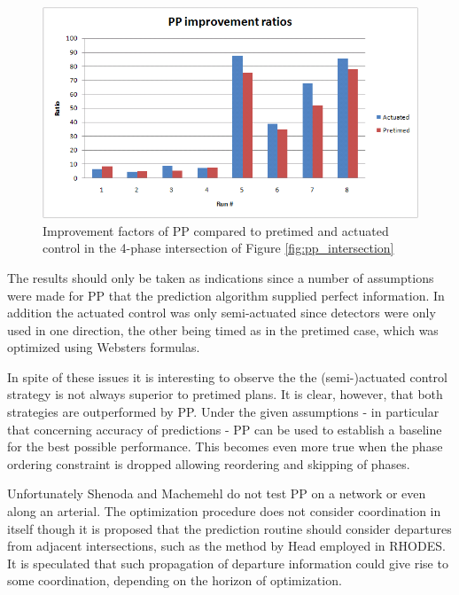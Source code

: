 \begin{figure}[!ht]
\begin{center}
\includegraphics[scale=0.5]{phase-by-phase_improvement_ratios.png} 
\end{center}
\caption{Improvement factors of PP compared to pretimed and actuated control in the 4-phase intersection of Figure \ref{fig:pp_intersection}}
\label{fig:pp_improvements}
\end{figure}

The results should only be taken as indications since a number of assumptions were made for PP that the prediction algorithm supplied perfect information. In addition the actuated control was only semi-actuated since detectors were only used in one direction, the other being timed as in the pretimed case, which was optimized using Websters formulas.

In spite of these issues it is interesting to observe the the (semi-)actuated control strategy is not always superior to pretimed plans. It is clear, however, that both strategies are outperformed by PP. Under the given assumptions - in particular that concerning accuracy of predictions - PP can be used to establish a baseline for the best possible performance. This becomes even more true when the phase ordering constraint is dropped allowing reordering and skipping of phases.

Unfortunately Shenoda and Machemehl do not test PP on a network or even along an arterial. The optimization procedure does not consider coordination in itself though it is proposed that the prediction routine should consider departures from adjacent intersections, such as the method by Head employed in RHODES. It is speculated that such propagation of departure information could give rise to some coordination, depending on the horizon of optimization.
